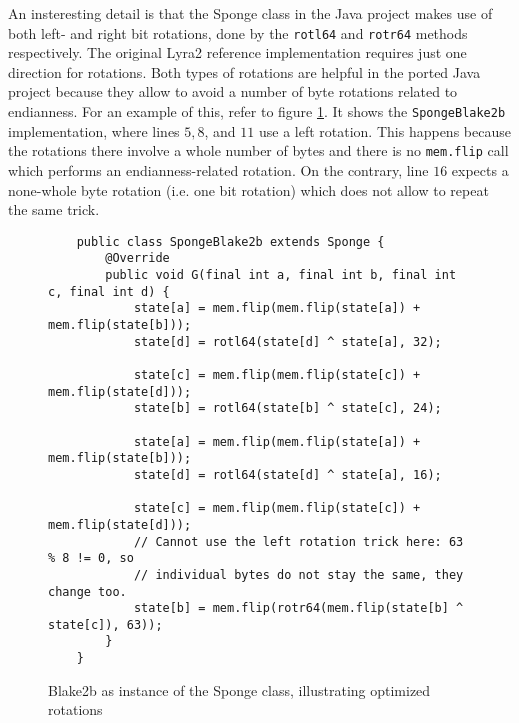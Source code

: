 An insteresting detail is that the Sponge class in the Java project makes use of both left- and right bit rotations, done by the \texttt{rotl64} and \texttt{rotr64} methods respectively. The original Lyra2 reference implementation requires just one direction for rotations. Both types of rotations are helpful in the ported Java project because they allow to avoid a number of byte rotations related to endianness. For an example of this,  refer to figure \ref{fig:sponge-blake2b}. It shows the \texttt{SpongeBlake2b} implementation, where lines \(5, 8\), and \(11\) use a left rotation. This happens because the rotations there involve a whole number of bytes and there is no \texttt{mem.flip} call which performs an endianness-related rotation. On the contrary, line \(16\) expects a none-whole byte rotation (i.e. one bit rotation) which does not allow to repeat the same trick.


\begin{figure}
\small
\begin{verbatim}
    public class SpongeBlake2b extends Sponge {
        @Override
        public void G(final int a, final int b, final int c, final int d) {
            state[a] = mem.flip(mem.flip(state[a]) + mem.flip(state[b]));
            state[d] = rotl64(state[d] ^ state[a], 32);

            state[c] = mem.flip(mem.flip(state[c]) + mem.flip(state[d]));
            state[b] = rotl64(state[b] ^ state[c], 24);

            state[a] = mem.flip(mem.flip(state[a]) + mem.flip(state[b]));
            state[d] = rotl64(state[d] ^ state[a], 16);

            state[c] = mem.flip(mem.flip(state[c]) + mem.flip(state[d]));
            // Cannot use the left rotation trick here: 63 % 8 != 0, so
            // individual bytes do not stay the same, they change too.
            state[b] = mem.flip(rotr64(mem.flip(state[b] ^ state[c]), 63));
        }
    }
\end{verbatim}
\normalsize
\caption{Blake2b as instance of the Sponge class, illustrating optimized rotations}
\label{fig:sponge-blake2b}
\end{figure}
